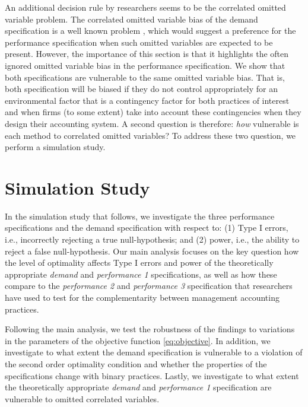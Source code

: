\documentclass[12pt]{article}
\begin{document}
An additional decision rule by researchers seems to be the correlated omitted variable problem. The correlated omitted variable bias of the demand specification is a well known problem \citep{grabner_management_2013,arora_testing_1996,carree_note_2011}, which would suggest a preference for the performance specification when such omitted variables are expected to be present. However, the importance of this section is that it highlights the often ignored omitted variable bias in the performance specification. We show that both specifications are vulnerable to the same omitted variable bias. That is, both specification will be biased if they do not control appropriately for an environmental factor that is a contingency factor for both practices of interest and when firms (to some extent) take into account these contingencies when they design their accounting system. A second question is therefore: \emph{how} vulnerable is each method to correlated omitted variables? To address these two question, we perform a simulation study.

\section{Simulation Study}\label{simulation-study}

In the simulation study that follows, we investigate the three performance specifications and the demand specification with respect to: (1) Type I errors, i.e., incorrectly rejecting a true null-hypothesis; and (2) power, i.e., the ability to reject a false null-hypothesis. Our main analysis focuses on the key question how the level of optimality affects Type I errors and power of the theoretically appropriate \emph{demand} and \emph{performance 1} specifications, as well as how these compare to the \emph{performance 2} and \emph{performance 3} specification that researchers have used to test for the complementarity between management accounting practices.  

Following the main analysis, we test the robustness of the findings to variations in the parameters of the objective function \eqref{eq:objective}. In addition, we investigate to what extent the demand specification is vulnerable to a violation of the second order optimality condition and whether the properties of the specifications change with binary practices. Lastly, we investigate to what extent the theoretically appropriate \emph{demand} and \emph{performance 1} specification are vulnerable to omitted correlated variables. 
\end{document}
